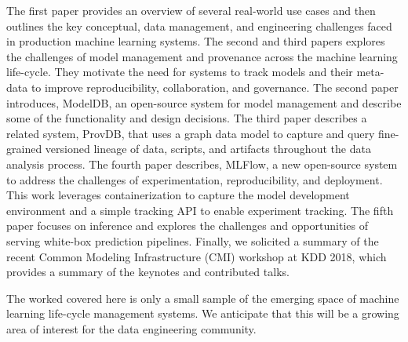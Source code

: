 \documentclass[11pt]{article}
\begin{document}
The first paper provides an overview of several real-world use cases and then outlines the key conceptual, data management, and engineering challenges faced in production machine learning systems.
The second and third papers explores the challenges of model management and provenance across the machine learning life-cycle.
They motivate the need for systems to track models and their meta-data to improve reproducibility, collaboration, and governance. 
The second paper introduces, ModelDB, an open-source system for model management and describe some of the functionality and design decisions. 
The third paper describes a related system, ProvDB, that uses a graph data model to capture and query fine-grained versioned lineage of data, scripts, and artifacts throughout the data analysis process.
The fourth paper describes, MLFlow, a new open-source system to address the challenges of experimentation, reproducibility, and deployment. 
This work leverages containerization to capture the model development environment and a simple tracking API to enable experiment tracking.
The fifth paper focuses on inference and explores the challenges and opportunities of serving white-box prediction pipelines.  
Finally, we solicited a summary of the recent Common Modeling Infrastructure (CMI) workshop at KDD 2018, which provides a summary of the keynotes and contributed talks.

The worked covered here is only a small sample of the emerging space of machine learning life-cycle management systems. 
We anticipate that this will be a growing area of interest for the data engineering community.


\end{document}
